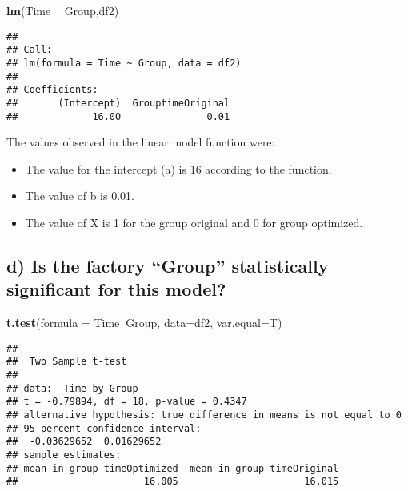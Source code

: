 \documentclass[
]{article}
\newenvironment{Shaded}{\begin{snugshade}}{\end{snugshade}}
\newcommand{\DataTypeTok}[1]{\textcolor[rgb]{0.13,0.29,0.53}{#1}}
\newcommand{\KeywordTok}[1]{\textcolor[rgb]{0.13,0.29,0.53}{\textbf{#1}}}
\newcommand{\NormalTok}[1]{#1}
\newcommand{\OperatorTok}[1]{\textcolor[rgb]{0.81,0.36,0.00}{\textbf{#1}}}
\newcommand{\StringTok}[1]{\textcolor[rgb]{0.31,0.60,0.02}{#1}}
\providecommand{\tightlist}{%
  \setlength{\itemsep}{0pt}\setlength{\parskip}{0pt}}
\begin{document}
\begin{Shaded}
\begin{Highlighting}[]
\KeywordTok{lm}\NormalTok{(Time }\OperatorTok{~}\StringTok{ }\NormalTok{Group,df2)}
\end{Highlighting}
\end{Shaded}

\begin{verbatim}
## 
## Call:
## lm(formula = Time ~ Group, data = df2)
## 
## Coefficients:
##       (Intercept)  GrouptimeOriginal  
##             16.00               0.01
\end{verbatim}

The values observed in the linear model function were:

\begin{itemize}
\tightlist
\item
  The value for the intercept (a) is 16 according to the function.
\item
  The value of b is 0.01.
\item
  The value of X is 1 for the group original and 0 for group optimized.
\end{itemize}

\hypertarget{d-is-the-factory-group-statistically-significant-for-this-model}{%
\subsection{d) Is the factory ``Group'' statistically significant for
this
model?}\label{d-is-the-factory-group-statistically-significant-for-this-model}}

\begin{Shaded}
\begin{Highlighting}[]
\KeywordTok{t.test}\NormalTok{(}\DataTypeTok{formula =}\NormalTok{ Time}\OperatorTok{~}\NormalTok{Group, }\DataTypeTok{data=}\NormalTok{df2, }\DataTypeTok{var.equal=}\NormalTok{T)}
\end{Highlighting}
\end{Shaded}

\begin{verbatim}
## 
##  Two Sample t-test
## 
## data:  Time by Group
## t = -0.79894, df = 18, p-value = 0.4347
## alternative hypothesis: true difference in means is not equal to 0
## 95 percent confidence interval:
##  -0.03629652  0.01629652
## sample estimates:
## mean in group timeOptimized  mean in group timeOriginal 
##                      16.005                      16.015
\end{verbatim}
\end{document}
